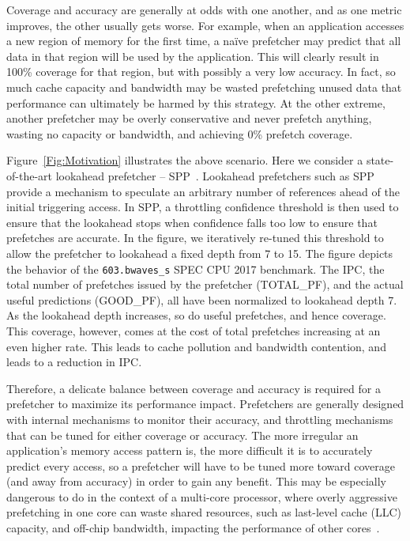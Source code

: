 Coverage and accuracy are generally at odds with one another, and as
one metric improves, the other usually gets worse. For example, when
an application accesses a new region of memory for the first time, a
na\"ive prefetcher may predict that all data in that region will be
used by the application.  This will clearly result in 100\% coverage
for that region, but with possibly a very low accuracy.  In fact, so
much cache capacity and bandwidth may be wasted prefetching unused
data that performance can ultimately be harmed by this strategy. At
the other extreme, another prefetcher may be overly conservative and
never prefetch anything, wasting no capacity or bandwidth, and
achieving 0\% prefetch coverage.

Figure~\ref{Fig:Motivation} illustrates the above scenario.  Here we
consider a state-of-the-art lookahead prefetcher -- SPP~\cite{SPP}.
Lookahead prefetchers such as SPP provide a mechanism to speculate an
arbitrary number of references ahead of the initial triggering access.
In SPP, a throttling confidence threshold is then used to ensure that
the lookahead stops when confidence falls too low to ensure that
prefetches are accurate.  In the figure, we iteratively re-tuned 
this threshold to allow the prefetcher to lookahead a fixed
depth from 7 to 15. The figure depicts the behavior 
of the {\tt 603.bwaves\_s} SPEC CPU 2017 benchmark. The IPC, the 
total number of prefetches issued by the prefetcher (TOTAL\_PF), 
and the actual useful predictions (GOOD\_PF), all have been normalized 
to lookahead depth 7. As the lookahead
depth increases, so do useful prefetches, and hence coverage. This
coverage, however, comes at the cost of total prefetches increasing at
an even higher rate. This leads to cache pollution and bandwidth
contention, and leads to a reduction in IPC.  

Therefore, a delicate balance between coverage and accuracy is
required for a prefetcher to maximize its performance impact.
Prefetchers are generally designed with internal mechanisms to monitor
their accuracy, and throttling mechanisms that can be tuned for either
coverage or accuracy.  The more irregular an application's memory
access pattern is, the more difficult it is to accurately predict
every access, so a prefetcher will have to be tuned more toward
coverage (and away from accuracy) in order to gain any benefit. This
may be especially dangerous to do in the context of a multi-core
processor, where overly aggressive prefetching in one core can waste
shared resources, such as last-level cache (LLC) capacity, and
off-chip bandwidth, impacting the performance of other
cores~\cite{Friendly}.

